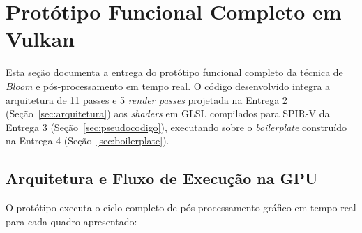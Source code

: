 
\section{Protótipo Funcional Completo em Vulkan}
\label{sec:prototipo}
\sloppy

Esta seção documenta a entrega do protótipo funcional completo da técnica de \textit{Bloom} e pós-processamento em tempo real. O código desenvolvido integra a arquitetura de 11 passes e 5 \textit{render passes} projetada na Entrega 2 (Seção~\ref{sec:arquitetura}) aos \textit{shaders} em GLSL compilados para SPIR-V da Entrega 3 (Seção~\ref{sec:pseudocodigo}), executando sobre o \textit{boilerplate} construído na Entrega 4 (Seção~\ref{sec:boilerplate}).

\subsection{Arquitetura e Fluxo de Execução na GPU}
O protótipo executa o ciclo completo de pós-processamento gráfico em tempo real para cada quadro apresentado:


